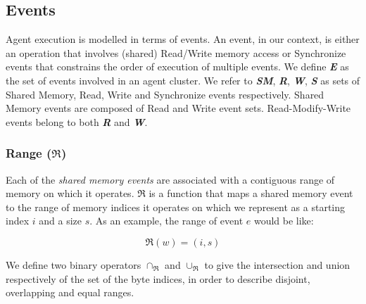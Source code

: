     
    \newcommand{\rmw}{\textit{rmw}\,}
    \newcommand{\set}[1]{\textbf{\textit{#1}}}

    \subsection{Events}
    Agent execution is modelled in terms of events. 
    An event, in our context, is either an operation that involves (shared) Read/Write memory access or Synchronize events that constrains the order of execution of multiple events. 
    We define \set{E} as the set of events involved in an agent cluster. 
    We refer to \set{SM}, \set{R}, \set{W}, \set{S} as sets of Shared Memory, Read, Write and Synchronize events respectively. Shared Memory events are composed of Read and Write event sets. Read-Modify-Write events belong to both \set{R} and \set{W}. 
       
        \subsubsection{Range ($\Re$)}
            Each of the \textit{shared memory events} are associated with a contiguous range of memory on which it operates. $\Re$ is a function that maps a shared memory event to the range of memory indices it operates on which we represent as a starting index $i$ and a size $s$. As an example, the range of event $e$ would be like: 
                    
                    \[\Re(w) = (i, s) \]
           
           
            We define two binary operators $\cap_\Re$ and $\cup_\Re$ to give the intersection and union respectively of the set of the byte indices, in order to describe disjoint, overlapping and equal ranges.  
            
